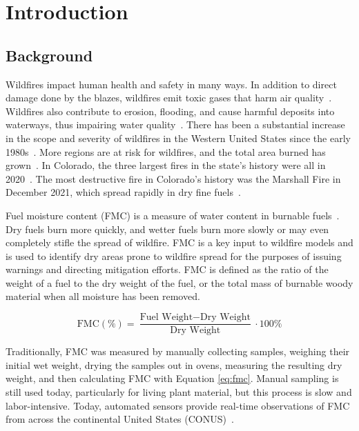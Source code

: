 \documentclass[fire,article,submit,pdftex,moreauthors]{Definitions/mdpi}
\begin{document}


\section{Introduction}
\subsection{Background}
\label{sec:bg}
Wildfires impact human health and safety in many ways. In addition to direct damage done by the blazes, wildfires emit toxic gases that harm air quality~\citep{WHO-2024-WFS}. Wildfires also contribute to erosion, flooding, and cause harmful deposits into waterways, thus impairing water quality~\citep{USGS-2024-WQA}. There has been a substantial increase in the scope and severity of wildfires in the Western United States since the early 1980s~\citep{Cartier-2022-UFQ}. More regions are at risk for wildfires, and the total area burned has grown~\citep{IPCC-2021-LCI}. In Colorado, the three largest fires in the state's history were all in 2020~\citep{CDFPC-2024-HWI}. The most destructive fire in Colorado's history was the Marshall Fire in December 2021, which spread rapidly in dry fine fuels~\citep{Juliano-2023-TBU}. 

Fuel moisture content (FMC) is a measure of water content in burnable fuels~\citep[e.g.,][]{NCEI-2024-DFM}. Dry fuels burn more quickly, and wetter fuels burn more slowly or may even completely stifle the spread of wildfire. FMC is a key input to wildfire models and is used to identify dry areas prone to wildfire spread for the purposes of issuing warnings and directing mitigation efforts. FMC is defined as the ratio of the weight of a fuel to the dry weight of the fuel, or the total mass of burnable woody material when all moisture has been removed. 
\begin{linenomath}
\begin{equation}
\label{eq:fmc}
    \text{FMC} (\%) = \frac{\text{Fuel Weight} - \text{Dry Weight}}{\text{Dry Weight}} \cdot 100\%
\end{equation}
\end{linenomath}
Traditionally, FMC was measured by manually collecting samples, weighing their initial wet weight, drying the samples out in ovens, measuring the resulting dry weight, and then calculating FMC with Equation \ref{eq:fmc}. Manual sampling is still used today, particularly for living plant material, but this process is slow and labor-intensive. Today, automated sensors provide real-time observations of FMC from across the continental United States (CONUS)~\citep{NIFC-2024-RAW}. 
\end{document}
